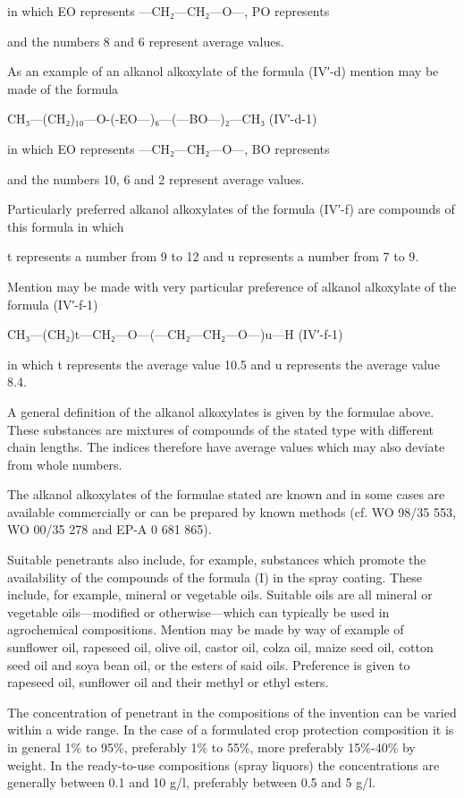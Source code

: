 \documentclass[11pt,a4paper]{article}
\begin{document}
in which EO represents —CH₂—CH₂—O—, PO represents

and the numbers 8 and 6 represent average values.

As an example of an alkanol alkoxylate of the formula (IV′-d) mention may be made of the formula

CH₃—(CH₂)₁₀—O-(-EO—)₆—(—BO—)₂—CH₃ (IV′-d-1)

in which EO represents —CH₂—CH₂—O—, BO represents

and the numbers 10, 6 and 2 represent average values.

Particularly preferred alkanol alkoxylates of the formula (IV′-f) are compounds of this formula in which

t represents a number from 9 to 12 and u represents a number from 7 to 9.

Mention may be made with very particular preference of alkanol alkoxylate of the formula (IV′-f-1)

CH₃—(CH₂)t—CH₂—O—(—CH₂—CH₂—O—)u—H (IV′-f-1)

in which t represents the average value 10.5 and u represents the average value 8.4.

A general definition of the alkanol alkoxylates is given by the formulae above. These substances are mixtures of compounds of the stated type with different chain lengths. The indices therefore have average values which may also deviate from whole numbers.

The alkanol alkoxylates of the formulae stated are known and in some cases are available commercially or can be prepared by known methods (cf. WO 98/35 553, WO 00/35 278 and EP-A 0 681 865).

Suitable penetrants also include, for example, substances which promote the availability of the compounds of the formula (I) in the spray coating. These include, for example, mineral or vegetable oils. Suitable oils are all mineral or vegetable oils—modified or otherwise—which can typically be used in agrochemical compositions. Mention may be made by way of example of sunflower oil, rapeseed oil, olive oil, castor oil, colza oil, maize seed oil, cotton seed oil and soya bean oil, or the esters of said oils. Preference is given to rapeseed oil, sunflower oil and their methyl or ethyl esters.

The concentration of penetrant in the compositions of the invention can be varied within a wide range. In the case of a formulated crop protection composition it is in general 1\% to 95\%, preferably 1\% to 55\%, more preferably 15\%-40\% by weight. In the ready-to-use compositions (spray liquors) the concentrations are generally between 0.1 and 10 g/l, preferably between 0.5 and 5 g/l.
\end{document}
